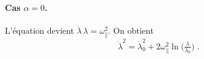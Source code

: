 \paragraph{Cas \(\alpha=0\).}
L'équation devient \(\ddot\lambda\,\lambda=\omega_\parallel^2\). On obtient
\[
\boxed{\; \dot\lambda^2 = \dot\lambda_0^2 + 2\omega_\parallel^2\ln\!\big(\tfrac{\lambda}{\lambda_0}\big)\; }.
\]








